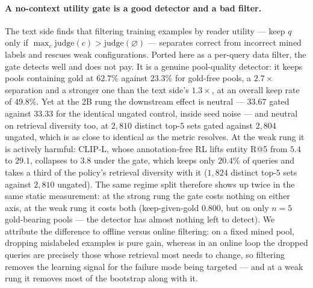 \paragraph{A no-context utility gate is a good detector and a bad filter.} The text side finds
that filtering training examples by reader utility --- keep $q$ only if
$\max_c \text{judge}(c) > \text{judge}(\varnothing)$ --- separates correct from incorrect mined
labels and rescues weak configurations. Ported here as a per-query data filter, the gate detects
well and does not pay. It is a genuine pool-quality detector: it keeps pools containing gold at
$62.7\%$ against $23.3\%$ for gold-free pools, a $2.7\times$ separation and a stronger one than
the text side's $1.3\times$, at an overall keep rate of $49.8\%$. Yet at the 2B rung the
downstream effect is neutral --- $33.67$ gated against $33.33$ for the identical ungated control,
inside seed noise --- and neutral on retrieval diversity too, at $2{,}810$ distinct top-$5$ sets
gated against $2{,}804$ ungated, which is as close to identical as the metric resolves. At the weak rung it is actively harmful: CLIP-L, whose annotation-free RL
lifts entity R@5 from $5.4$ to $29.1$, collapses to $3.8$ under the gate, which keeps only
$20.4\%$ of queries and takes a third of the policy's retrieval diversity with it ($1{,}824$
distinct top-$5$ sets against $2{,}810$ ungated). The same regime split therefore shows up twice
in the same static measurement: at the strong rung the gate costs nothing on either axis, at the
weak rung it costs both (keep-given-gold $0.800$, but on only $n{=}5$ gold-bearing pools --- the
detector has almost nothing left to detect). We attribute the difference to offline versus online
filtering: on a fixed mined pool, dropping mislabeled examples is pure gain, whereas in an online
loop the dropped queries are precisely those whose retrieval most needs to change, so filtering
removes the learning signal for the failure mode being targeted --- and at a weak rung it removes
most of the bootstrap along with it.


